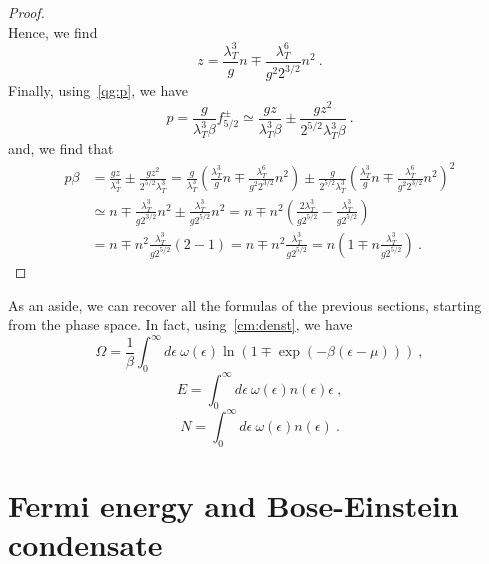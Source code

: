 \begin{proof}
\begin{equation*}
        \end{equation*}
        Hence, we find 
        \begin{equation*}
            z = \frac{\lambda_T^3}{g} n \mp \frac{\lambda_T^6}{g^2 2^{3/2}} n^2 ~.
        \end{equation*}
        Finally, using~\eqref{qg:p}, we have
        \begin{equation*}
            p = \frac{g}{\lambda_T^3 \beta} f^\pm_{5/2} \simeq \frac{gz}{\lambda_T^3\beta} \pm \frac{g z^2}{2^{5/2} \lambda_T^3 \beta} ~.
        \end{equation*}
        and, we find that
        \begin{equation*}
        \begin{aligned}
            p \beta &= \frac{gz}{\lambda_T^3} \pm \frac{g z^2}{2^{5/2} \lambda_T^3}  = \frac{g}{\lambda_T^3} (\frac{\lambda_T^3}{g} n \mp \frac{\lambda_T^6}{g^2 2^{3/2}} n^2) \pm \frac{g}{2^{5/2} \lambda_T^3} (\frac{\lambda_T^3}{g} n \mp \frac{\lambda_T^6}{g^2 2^{3/2}} n^2)^2 \\ & \simeq n \mp \frac{\lambda^3_T}{g 2^{3/2}} n^2 \pm \frac{\lambda^3_T}{g 2^{5/2}} n^2 = n \mp n^2 (\frac{2\lambda^3_T}{g 2^{5/2}} - \frac{\lambda^3_T}{g 2^{5/2}} ) \\ & = n \mp n^2 \frac{\lambda^3_T}{g 2^{5/2}}(2 - 1) = n \mp n^2 \frac{\lambda^3_T}{g 2^{5/2}} = n ( 1 \mp n \frac{\lambda_T^3}{g 2^{5/2}} ) ~.
        \end{aligned}
        \end{equation*}
    \end{proof}

    As an aside, we can recover all the formulas of the previous sections, starting from the phase space. In fact, using~\eqref{cm:denst}, we have 
    \begin{equation}\label{q:o}
        \Omega = \frac{1}{\beta} \int_0^\infty d\epsilon ~ \omega(\epsilon) \ln (1 \mp \exp(- \beta (\epsilon - \mu))) ~,
    \end{equation}
    \begin{equation}\label{q:e}
        E = \int_0^\infty d\epsilon ~ \omega(\epsilon) n(\epsilon) \epsilon ~,
    \end{equation}
    \begin{equation}\label{q:n}
        N = \int_0^\infty d\epsilon ~ \omega(\epsilon) n(\epsilon) ~.
    \end{equation}

\chapter{Fermi energy and Bose-Einstein condensate}

